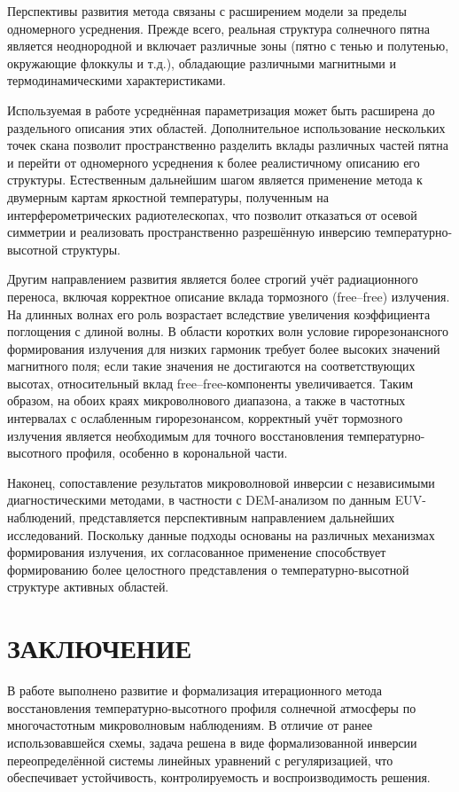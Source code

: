 \documentclass[
 aps, pra,
 amsmath,amssymb,
 11pt,
 final,
tightenlines,
 twoside,
 twocolumn,
 nofloats,
nofootinbib,
 superscriptaddress,
showkeys,
showkeywords,
 ]
{revtex4-2}
\begin{document}
Перспективы развития метода  связаны с расширением модели
за пределы одномерного усреднения. Прежде всего, реальная структура солнечного пятна является
неоднородной и включает  различные зоны (пятно с тенью и полутенью,  окружающие флоккулы и т.д.),
обладающие различными магнитными и термодинамическими
характеристиками.

Используемая в работе усреднённая параметризация
может быть расширена до раздельного описания этих областей.
Дополнительное использование нескольких точек скана
позволит пространственно разделить вклады различных
частей пятна и перейти от одномерного усреднения
к более реалистичному описанию его структуры. Естественным дальнейшим шагом является применение метода
к двумерным картам яркостной температуры,
полученным на интерферометрических радиотелескопах,
что позволит отказаться от осевой симметрии
и реализовать пространственно разрешённую
инверсию температурно-высотной структуры.

Другим направлением развития является более строгий учёт
радиационного переноса, включая корректное описание
вклада тормозного (free--free) излучения.
На длинных волнах его роль возрастает вследствие увеличения
коэффициента поглощения с длиной волны.
В области коротких волн условие гирорезонансного формирования
излучения для низких гармоник требует более высоких значений
магнитного поля; если такие значения не достигаются
на соответствующих высотах, относительный вклад
free--free-компоненты увеличивается.
Таким образом, на обоих краях микроволнового диапазона,
а также в частотных интервалах с ослабленным гирорезонансом,
корректный учёт тормозного излучения является необходимым
для точного восстановления температурно-высотного профиля,
особенно в корональной части.

Наконец, сопоставление результатов микроволновой инверсии
с независимыми диагностическими методами, в частности
с DEM-анализом по данным EUV-наблюдений, представляется
перспективным направлением дальнейших исследований.
Поскольку данные подходы основаны на различных механизмах
формирования излучения, их согласованное применение
способствует формированию более целостного представления
о температурно-высотной структуре активных областей.

\section{ЗАКЛЮЧЕНИЕ}

В работе выполнено развитие и формализация итерационного метода
восстановления температурно-высотного профиля солнечной атмосферы
по многочастотным микроволновым наблюдениям. В отличие от ранее
использовавшейся схемы, задача решена в виде формализованной
инверсии переопределённой системы линейных уравнений
с регуляризацией, что обеспечивает устойчивость,
контролируемость и воспроизводимость решения.
\end{document}
